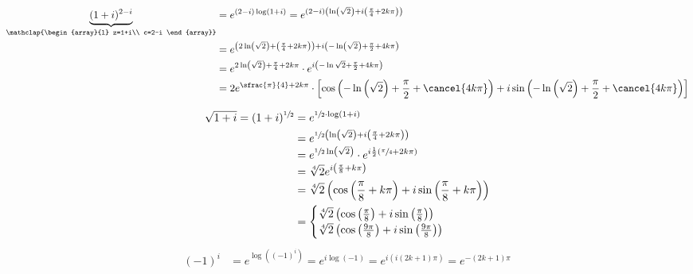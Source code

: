 \documentclass[12pt,a4paper,notitlepage,fleqn]{article}
\begin{document}
    \begin{align*}
    \underbrace{(1+i)^{2-i}}_{\mathclap{\begin{array}{l}
    		z=1+i\\ c=2-i
    		\end{array}}} &= e^{(2-i)\log(1+i)}
    = e^{(2-i)\left( \ln\left(\sqrt{2}\right)+i\left(
    	\frac{\pi}{4}+2k\pi
    	\right) \right)}
    \\ &= e^{
       	\left(
       	2\ln\left(\sqrt{2}\right)+\left(\frac{\pi}{4}+2k\pi\right)
       	\right)+i\left(
       	-\ln\left(\sqrt{2}\right)+\frac{\pi}{2}+4k\pi
       	\right)
    }
    \\ &= e^{2\ln\left(\sqrt{2}\right)+\frac{\pi}{4}+2k\pi} \cdot
    e^{i\left(
       	-\ln\sqrt{2}+\frac{\pi}{2}+4k\pi
       	\right)}
    \\ &= 2e^{\sfrac{\pi}{4}+2k\pi}\cdot\left[
    \cos\left(
    -\ln\left(\sqrt{2}\right)+\frac{\pi}{2}+\cancel{4k\pi}
    \right)+i\sin\left(
    -\ln\left(\sqrt{2}\right)+\frac{\pi}{2}+\cancel{4k\pi}
    \right)
    \right]
    \end{align*}

    \begin{align*}
    \sqrt{1+i} = (1+i)^{\sfrac{1}{2}} &= e^{\sfrac{1}{2}\cdot\log(1+i)} \\
    &= e^{\sfrac{1}{2}\left( \ln\left(\sqrt{2}\right)
    	+i\left( \frac{\pi}{4}+2k\pi \right)
    	 \right)}
    \\ &= e^{\sfrac{1}{2}\ln\left(\sqrt{2}\right)}\cdot e^{
    	i\frac{1}{2}\left( \sfrac{\pi}{4}+2k\pi \right)
    	}
    \\ &= \sqrt[4]{2}e^{i\left( \frac{\pi}{8}+k\pi \right)}
    \\ &= \sqrt[4]{2}\left( \cos\left( \frac{\pi}{8}+k\pi \right)
    +i\sin\left( \frac{\pi}{8}+k\pi \right)\right)
    \\ &= \begin{cases}
    \sqrt[4]{2} \left( \cos\left( \frac{\pi}{8} \right)
    +i\sin\left( \frac{\pi}{8} \right)\right) \\
    \sqrt[4]{2} \left( \cos\left( \frac{9\pi}{8} \right)
    +i\sin\left( \frac{9\pi}{8} \right)\right)
    \end{cases}
    \end{align*}
    \begin{align*}
    (-1)^i &= e^{\log\left( (-1)^i \right)}
    =e^{i\log(-1)} = e^{
    	i\left( i(2k+1)\pi \right)
    	} = e^{-(2k+1)\pi}
    \end{align*}
\end{document}
